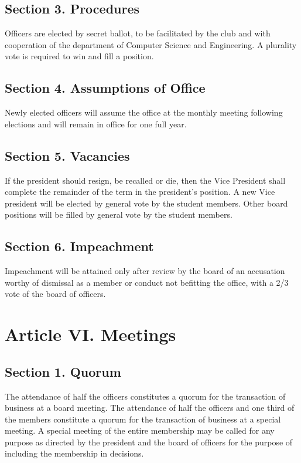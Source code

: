 \documentclass{article}
\begin{document}
  \subsection{Section 3. Procedures}
  Officers are elected by secret ballot, to be facilitated by the club and with cooperation of the department of Computer Science and Engineering. A plurality vote is required to win and fill a position.

  \subsection{Section 4. Assumptions of Office}
  Newly elected officers will assume the office at the monthly meeting following elections and will remain in office for one full year.

  \subsection{Section 5. Vacancies}
  If the president should resign, be recalled or die, then the Vice President shall complete the remainder of the term in the president’s position. A new Vice president will be elected by general vote by the student members.  Other board positions will be filled by general vote by the student members.

  \subsection{Section 6. Impeachment}
  Impeachment will be attained only after review by the board of an accusation worthy of dismissal as a member or conduct not befitting the office, with a 2/3 vote of the board of officers.

\section{Article VI. Meetings}
  \subsection{Section 1. Quorum}
  The attendance of half the officers constitutes a quorum for the transaction of business at a board meeting. The attendance of half the officers and one third of the members constitute a quorum for the transaction of business at a special meeting. A special meeting of the entire membership may be called for any purpose as directed by the president and the board of officers for the purpose of including the membership in decisions.
\end{document}
